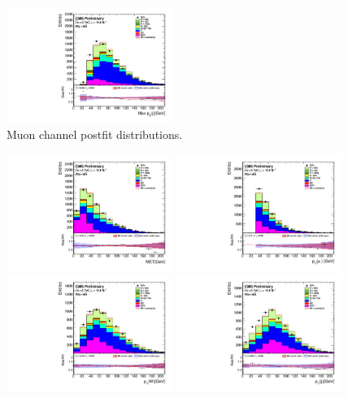 \begin{figure}[htbp]
		\includegraphics[width=0.48\textwidth]{Figures/Results/Muon/postfit/Wbb_max_hJet_pt_doQCD1.pdf}		
	\caption{Muon channel postfit distributions.}
	\label{fig:Wbb_postfit_mu}
\end{figure}

\begin{figure}[htbp]
	\centering
		\includegraphics[width=0.48\textwidth]{Figures/Results/Electron/postfit/Wbb_GetMET_doQCD1.pdf}
		\includegraphics[width=0.48\textwidth]{Figures/Results/Electron/postfit/Wbb_vLepton_pt_doQCD1.pdf}
		\includegraphics[width=0.48\textwidth]{Figures/Results/Electron/postfit/Wbb_GetWpt_doQCD1.pdf}
		\includegraphics[width=0.48\textwidth]{Figures/Results/Electron/postfit/Wbb_H_pt_doQCD1.pdf}

\end{figure}
